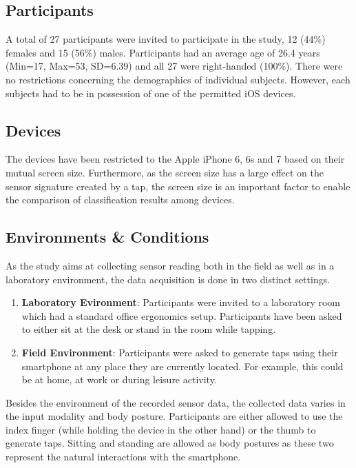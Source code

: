 \subsection{Participants}
A total of 27 participants were invited to participate in the study, 12 (44\%) females and 15 (56\%) males. Participants had an average age of 26.4 years (Min=17, Max=53, SD=6.39) and all 27 were right-handed (100\%). There were no restrictions concerning the demographics of individual subjects. However, each subjects had to be in  possession of one of the permitted iOS devices.

\subsection{Devices}
The devices have been restricted to the Apple iPhone 6, 6s and 7 based on their mutual screen size. Furthermore, as the screen size has a large effect on the sensor signature created by a tap, the screen size is an important factor to enable the comparison of classification results among devices.

\subsection{Environments \& Conditions}
As the study aims at collecting sensor reading both in the field as well as in a laboratory environment, the data acquisition is done in two distinct settings.

\begin{enumerate}
  \item \textbf{Laboratory Evironment}: Participants were invited to a laboratory room which had a standard office ergonomics setup. Participants have been asked to either sit at the desk or stand in the room while tapping.
  \item \textbf{Field Environment}: Participants were asked to generate taps using their smartphone at any place they are currently located. For example, this could be at home, at work or during leisure activity. 
\end{enumerate}

Besides the environment of the recorded sensor data, the collected data varies in the input modality and body posture. Participants are either allowed to use the index finger (while holding the device in the other hand) or the thumb to generate taps. Sitting and standing are allowed as body postures as these two represent the natural interactions with the smartphone.

